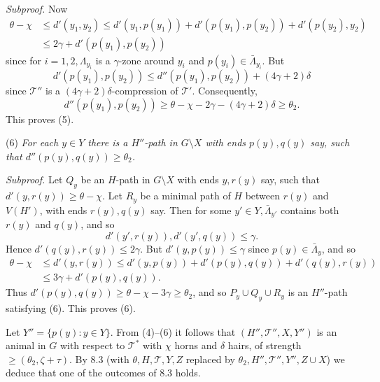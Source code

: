 \textit{Subproof.} Now
\begin{align*}
\theta - \chi &\le d'(y_1, y_2) \le d'(y_1, p(y_1)) + d'(p(y_1), p(y_2)) + d'(p(y_2), y_2) \\
&\le 2\gamma + d'(p(y_1), p(y_2))
\end{align*}
since for $i = 1, 2, \Lambda_{y_i}$ is a $\gamma$-zone around $y_i$ and $p(y_i) \in \bar{\Lambda}_{y_i}$. But
\begin{equation*}
d'(p(y_1), p(y_2)) \le d''(p(y_1), p(y_2)) + (4\gamma + 2)\delta
\end{equation*}
since $\mathscr{T}''$ is a $(4\gamma + 2)\delta$-compression of $\mathscr{T}'$. Consequently,
\begin{equation*}
d''(p(y_1), p(y_2)) \ge \theta - \chi - 2\gamma - (4\gamma + 2)\delta \ge \theta_2.
\end{equation*}
This proves (5).

\hspace*{12pt}(6) \textit{For each $y \in Y$ there is a $H''$-path in $G \setminus X$ with ends $p(y), q(y)$ say, such that $d''(p(y), q(y)) \ge \theta_2$.}

\textit{Subproof.} Let $Q_y$ be an $H$-path in $G \setminus X$ with ends $y, r(y)$ say, such that $d'(y, r(y)) \ge \theta - \chi$. Let $R_y$ be a minimal path of $H$ between $r(y)$ and $V(H')$, with ends $r(y), q(y)$ say. Then for some $y' \in Y, \bar{\Lambda}_{y'}$ contains both $r(y)$ and $q(y)$, and so
\begin{equation*}
d'(y', r(y)), d'(y', q(y)) \le \gamma.
\end{equation*}
Hence $d'(q(y), r(y)) \le 2\gamma$. But $d'(y, p(y)) \le \gamma$ since $p(y) \in \bar{\Lambda}_y$, and so
\begin{align*}
\theta - \chi &\le d'(y, r(y)) \le d'(y, p(y)) + d'(p(y), q(y)) + d'(q(y), r(y)) \\
&\le 3\gamma + d'(p(y), q(y)).
\end{align*}
Thus $d'(p(y), q(y)) \ge \theta - \chi - 3\gamma \ge \theta_2$, and so $P_y \cup Q_y \cup R_y$ is an $H''$-path satisfying (6). This proves (6).

Let $Y'' = \{p(y) \colon y \in Y\}$. From (4)--(6) it follows that $(H'', \mathscr{T}'', X, Y'')$ is an animal in $G$ with respect to $\mathscr{T}^*$ with $\chi$ horns and $\delta$ hairs, of strength $\ge (\theta_2, \zeta + \tau)$. By 8.3 (with $\theta, H, \mathscr{T}, Y, Z$ replaced by $\theta_2, H'', \mathscr{T}'', Y'', Z \cup X$) we deduce that one of the outcomes of 8.3 holds.

